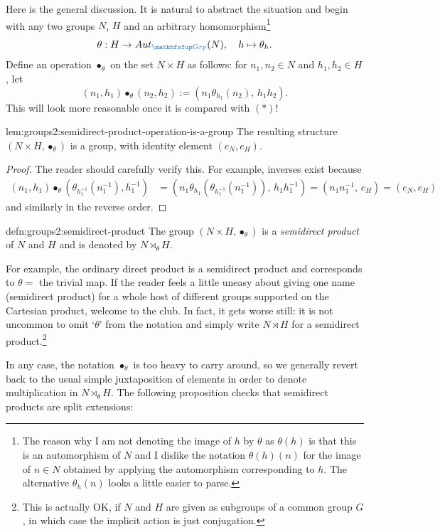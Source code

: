 Here is the general discussion. It is natural to abstract the
situation and begin with any two groups $N$, $H$ and an arbitrary
homomorphism\footnote{The reason why I am not denoting the image of
  $h$ by $\theta$ as $\theta(h)$ is that this is an automorphism of
  $N$ and I dislike the notation $\theta(h)(n)$ for the image of
  $n \in N$ obtained by applying the automorphism corresponding to
  $h$. The alternative $\theta_h(n)$ looks a little easier to parse.}
\[\theta : H \to \Aut_{\categ{Grp}}(N), \quad
  h \mapsto \theta_h.\] Define an operation $\bullet_\theta$ on the
set $N \times H$ as follows: for $n_1, n_2 \in N$ and
$h_1, h_2 \in H$, let
\[(n_1, h_1) \bullet_\theta (n_2, h_2) := (n_1 \theta_{h_1}(n_2),\,
  h_1 h_2).\] This will look more reasonable once it is compared with
$(*)$!
\begin{lem}{}{lem:groups2:semidirect-product-operation-is-a-group}
  The resulting structure $(N \times H, \bullet_\theta)$ is a group,
  with identity element $(e_N, e_H)$.
\end{lem}
\begin{proof}
  The reader should carefully verify this. For example, inverses exist
  because
  \begin{align*}
    (n_1, h_1) \bullet_\theta (\theta_{h_1^{-1}}(n_1^{-1}), h_1^{-1})
    &= (n_1 \theta_{h_1}(\theta_{h_1^{-1}}(n_1^{-1})),\, h_1 h_1^{-1})
      = (n_1 n_1^{-1},\, e_H) = (e_N, e_H)
  \end{align*}
  and similarly in the reverse order.
\end{proof}
\begin{defn}{}{defn:groups2:semidirect-product}
  The group $(N \times H, \bullet_\theta)$ is a \emph{semidirect
    product} of $N$ and $H$ and is denoted by $N \rtimes_\theta H$.
\end{defn}
For example, the ordinary direct product is a semidirect product and
corresponds to $\theta = $ the trivial map. If the reader feels a
little uneasy about giving one name (semidirect product) for a whole
host of different groups supported on the Cartesian product, welcome
to the club. In fact, it gets worse still: it is not uncommon to omit
`$\theta$' from the notation and simply write $N \rtimes H$ for a
semidirect product.\footnote{This is actually OK, if $N$ and $H$ are
  given as subgroups of a common group $G$, in which case the implicit
  action is just conjugation.}

In any case, the notation $\bullet_\theta$ is too heavy to carry
around, so we generally revert back to the usual simple juxtaposition
of elements in order to denote multiplication in $N \rtimes_\theta H$.
The following proposition checks that semidirect products are split
extensions:


